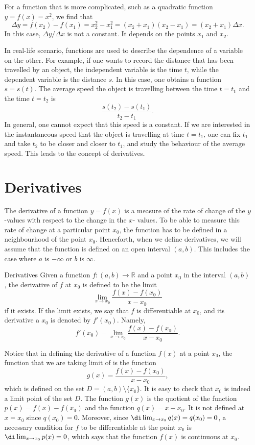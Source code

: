 For a function that is more complicated, such as a quadratic function $y=f(x)=x^2$, we find that
\[\Delta y=f(x_2)-f(x_1)=x_2^2-x_1^2=(x_2+x_1)(x_2-x_1)=(x_2+x_1)\Delta x.\]
In this case, $\Delta y/\Delta x$ is not a constant. It depends on the points $x_1$ and $x_2$. 

In real-life scenario, functions are used to describe the dependence of a variable on the other. For example, if one wants to record the distance that has been travelled by an object,  the independent variable is the time $t$, while the dependent variable is the distance $s$. In this case, one obtains a function $s=s(t)$. The average speed the object is travelling between the time $t=t_1$ and the time $t=t_2$ is
\[\frac{s(t_2)-s(t_1)}{t_2-t_1}.\]In general, one cannot expect that this speed is a constant. If we are interested in the instantaneous speed that the object is travelling at time $t=t_1$, one can fix $t_1$ and  take  $ t_2$ to be closer and closer to $t_1$, and study the behaviour of the average speed. This leads to the concept of derivatives.


\section{Derivatives }\label{sec3.1}

The derivative of a function $y=f(x)$ is a measure of the rate of change of the $y$-values with respect to the change in the $x$- values. To be able to measure this rate of change at a particular point $x_0$, the function has to be defined in a neighbourhood of the point $x_0$. Henceforth, when we define derivatives, we will assume that the function is defined on an open interval $(a, b)$. This includes the case where $a$ is $-\infty$ or $b$ is $\infty$.

\begin{definition}{Derivatives}
  Given a function $f:(a,b)\to \mathbb{R}$ and a point $x_0$ in the interval $(a, b)$, the derivative of $f$ at $x_0$ is defined to be the limit
\[\lim_{x\rightarrow x_0} \frac{f(x)-f(x_0)}{x-x_0}\] if it exists. If the limit exists, we say that $f$ is differentiable at $x_0$, and its derivative a $x_0$ is denoted by $f'(x_0)$. Namely,
\[f'(x_0)=\lim_{x\rightarrow x_0} \frac{f(x)-f(x_0)}{x-x_0}.\]

\end{definition}


Notice that in defining the derivative of a function $f(x)$ at a point $x_0$, the function that we are taking limit of is the function
\[g(x)=\frac{f(x)-f(x_0)}{x-x_0},\]
which is defined on the set $D=(a,b)\setminus\{x_0\}$. It is easy to check that $x_0$ is indeed a limit point of the set  $D$. The function $g(x)$ is the quotient of the function $p(x)=f(x)-f(x_0)$ and the function $q(x)=x-x_0$. It is not defined at $x=x_0$ since $q(x_0)=0$. Moreover, since  $\di\lim_{x\rightarrow x_0}q(x)=q(x_0)=0$,  a necessary condition for $f$ to be differentiable at the point $x_0$ is $\di\lim_{x\rightarrow x_0}p(x)=0$, which says that  the function $f(x)$ is continuous at $x_0$.

